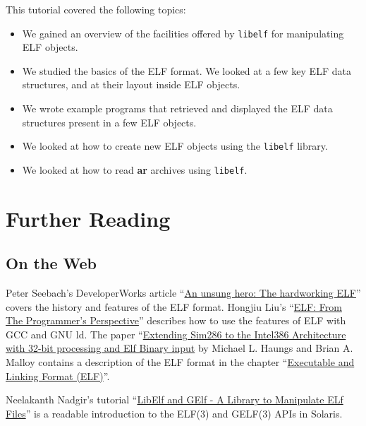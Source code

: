 \documentclass[a4paper,pdftex]{book}
\newcommand{\library}[1]{\texttt{#1}}
\newcommand{\tool}[1]{\textbf{#1}}
\newcommand{\trade}{\texttrademark\xspace}
\begin{document}
This tutorial covered the following topics:
\begin{itemize}
\item We gained an overview of the facilities offered by
  \library{libelf} for manipulating ELF objects.
\item We studied the basics of the ELF format. We looked at a few key
  ELF data structures, and at their layout inside ELF objects.
\item We wrote example programs that retrieved and displayed the ELF
  data structures present in a few ELF objects.
\item We looked at how to create new ELF objects using the
  \library{libelf} library.
\item We looked at how to read \tool{ar} archives using
  \library{libelf}.
\end{itemize}

\section{Further Reading}


\subsection{On the Web}
Peter Seebach's DeveloperWorks article ``\href{%
https://web.archive.org/web/20070224140341/http://www-128.ibm.com/developerworks/power/library/pa-spec12/%
}{An unsung hero: The hardworking ELF}'' covers the history and
features of the ELF format. Hongjiu Liu's ``\href{%
https://citeseerx.ist.psu.edu/viewdoc/summary?doi=10.1.1.37.8698}{ELF:
From The Programmer's Perspective}'' describes how to use the
features of ELF with GCC and GNU ld.  The paper ``\href{%
http://citeseerx.ist.psu.edu/viewdoc/summary?doi=10.1.1.136.2517}{Extending
Sim286 to the Intel386 Architecture with 32-bit processing and Elf
Binary input} by Michael L. Haungs and Brian A. Malloy contains a
description of the ELF format in the chapter ``\href{%
https://web.archive.org/web/20071217235525/www.cs.ucdavis.edu/~haungs/paper/node10.html%
}{Executable and Linking Format (ELF)}''.

Neelakanth Nadgir's tutorial ``\href{%
https://web.archive.org/web/20110926220119/http://developers.sun.com/solaris/articles/elf.html%
}{LibElf and GElf - A Library to Manipulate ELf Files}'' is a readable
introduction to the ELF(3) and GELF(3) APIs in Solaris\trade.
\end{document}
